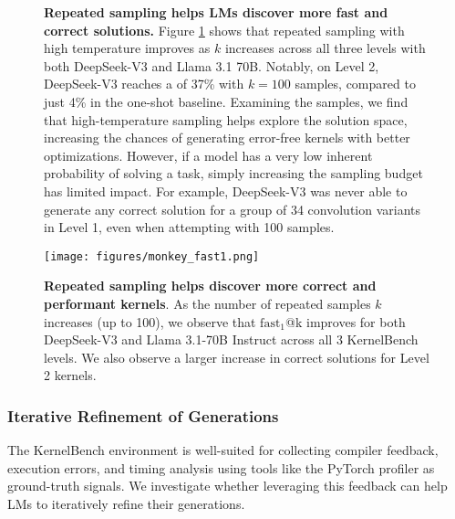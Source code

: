 \begin{figure}[ht]
    \centering
    \begin{minipage}{0.43\textwidth}
    \textbf{Repeated sampling helps LMs discover more fast and correct solutions.} Figure \ref{fig-multisample-passk} shows that repeated sampling with high temperature improves  as $k$ increases across all three levels with both DeepSeek-V3 and Llama 3.1 70B. Notably, on Level 2, DeepSeek-V3 reaches a  of 37\% with $k=100$ samples, compared to just 4\% in the one-shot baseline. Examining the samples, we find that high-temperature sampling helps explore the solution space, increasing the chances of generating error-free kernels with better optimizations. However, if a model has a very low inherent probability of solving a task, simply increasing the sampling budget has limited impact. For example, DeepSeek-V3 was never able to generate any correct solution for a group of 34 convolution variants in Level 1, even when attempting with 100 samples.
    
    \end{minipage}
    \hfill
        \begin{minipage}{0.55\textwidth}
        
    \begin{center}
    \vspace{-2mm}
    \centerline{\texttt{[image: figures/monkey\_fast1.png]}}
    \caption{\textbf{Repeated sampling helps discover more correct and performant kernels}. As the number of repeated samples $k$ increases (up to 100), we observe that $\text{fast}_1$@k improves for both DeepSeek-V3 and Llama 3.1-70B Instruct across all 3 KernelBench levels. We also observe a larger increase in correct solutions for Level 2 kernels. }
    \label{fig-multisample-passk}
    \end{center}

    \end{minipage}
    
\end{figure}

\subsubsection{Iterative Refinement of Generations}
\label{sec:iterative-refinement}

The KernelBench environment is well-suited for collecting compiler feedback, execution errors, and timing analysis using tools like the PyTorch profiler as ground-truth signals. We investigate whether leveraging this feedback can help LMs to iteratively refine their generations.


